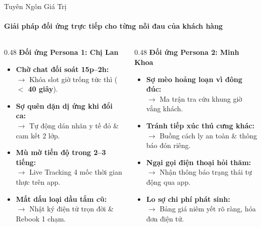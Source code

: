 \begin{frame}{Tuyên Ngôn Giá Trị}
  \framesubtitle{\color{white!90}\textbf{Giải pháp đối ứng trực tiếp cho từng nỗi đau của khách hàng}}

  \begin{columns}[T]
    \begin{column}{0.48\textwidth}
      {\color{PetcarePrimary}\large \textbf{Đối ứng Persona 1: Chị Lan}}\\[2mm]
      \small
      \begin{itemize}
        \setlength\itemsep{2.5mm}
        \item \textbf{Chờ chat đối soát 15p--2h:}\\
          $\rightarrow$ Khóa slot giờ trống tức thì (\textbf{$<$ 40 giây}).
        \item \textbf{Sợ quên dặn dị ứng khi đổi ca:}\\
          $\rightarrow$ Tự động dán nhãn y tế đỏ \& cam kết 2 lớp.
        \item \textbf{Mù mờ tiến độ trong 2--3 tiếng:}\\
          $\rightarrow$ Live Tracking 4 mốc thời gian thực trên app.
        \item \textbf{Mất dấu loại dầu tắm cũ:}\\
          $\rightarrow$ Nhật ký điện tử trọn đời \& Rebook 1 chạm.
      \end{itemize}
    \end{column}

    \begin{column}{0.48\textwidth}
      {\color{PetcarePrimary}\large \textbf{Đối ứng Persona 2: Minh Khoa}}\\[2mm]
      \small
      \begin{itemize}
        \setlength\itemsep{2.5mm}
        \item \textbf{Sợ mèo hoảng loạn vì đông đúc:}\\
          $\rightarrow$ Ma trận tra cứu khung giờ vắng khách.
        \item \textbf{Tránh tiếp xúc thú cưng khác:}\\
          $\rightarrow$ Buồng cách ly an toàn \& thông báo đón riêng.
        \item \textbf{Ngại gọi điện thoại hỏi thăm:}\\
          $\rightarrow$ Nhận thông báo trạng thái tự động qua app.
        \item \textbf{Lo sợ chi phí phát sinh:}\\
          $\rightarrow$ Bảng giá niêm yết rõ ràng, hóa đơn điện tử.
      \end{itemize}
    \end{column}
  \end{columns}
\end{frame}
